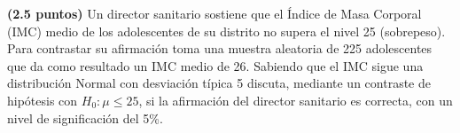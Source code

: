 
\textbf{(2.5 puntos)} Un director sanitario sostiene que el Índice de Masa Corporal (IMC) medio de los adolescentes de su distrito no supera el nivel 25 (sobrepeso). Para contrastar su afirmación toma una muestra aleatoria de 225 adolescentes que da como resultado un IMC medio de 26. Sabiendo que el IMC sigue una distribución Normal con desviación típica 5 discuta, mediante un contraste de hipótesis con $H_0:\mu\leq25$, si la afirmación del director sanitario es correcta, con un nivel de significación del 5\%.
